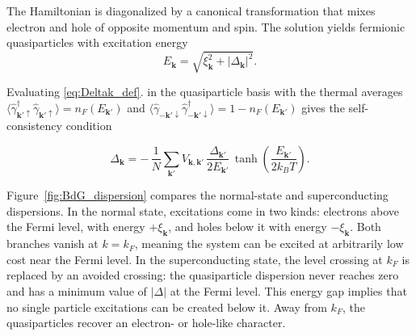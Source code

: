 \documentclass[11pt,a4paper,twoside,openany]{report}
\begin{document}
The Hamiltonian is diagonalized by a canonical transformation
that mixes electron and hole of opposite momentum and spin. The solution yields fermionic quasiparticles with excitation energy
\[
  E_{\mathbf{k}} = \sqrt{\xi_{\mathbf{k}}^{2}+|\Delta_{\mathbf{k}}|^{2}} .
\]


Evaluating \eqref{eq:Deltak_def}.  in the quasiparticle basis with the thermal averages
$\langle \hat{\gamma}_{\mathbf{k}'\uparrow}^{\dagger} \hat{\gamma}_{\mathbf{k}'\uparrow} \rangle
 = n_{F}(E_{\mathbf{k}'})$
and
$\langle \hat{\gamma}_{-\mathbf{k}'\downarrow} \hat{\gamma}_{-\mathbf{k}'\downarrow}^{\dagger} \rangle
 = 1-n_{F}(E_{\mathbf{k}'})$ gives the self-consistency condition
 
\begin{equation}\label{eq:gap_eq_momentum}
  \boxed{
  \Delta_{\mathbf{k}} = -\,\frac{1}{N} \sum_{\mathbf{k}'} V_{\mathbf{k},\mathbf{k}'}\,
  \frac{\Delta_{\mathbf{k}'}}{2E_{\mathbf{k}'}}\,
  \tanh\!\left( \frac{E_{\mathbf{k}'}}{2k_{B}T} \right) .} 
\end{equation}

Figure~\ref{fig:BdG_dispersion} compares the normal-state and superconducting dispersions. In the normal state, excitations come in two kinds: electrons above the Fermi level, with energy $+\xi_\mathbf{k}$, and holes below it with energy $-\xi_\mathbf{k}$. Both branches vanish at $k=k_F$, meaning the system can be excited at arbitrarily low cost near the Fermi level. In the superconducting state, the level crossing at $k_F$ is replaced by an avoided crossing: the quasiparticle dispersion never reaches zero and has a minimum value of $|\Delta|$ at the Fermi level. This energy gap implies that no single particle excitations can be created below it. Away from $k_F$, the quasiparticles recover an electron- or hole-like character.
\end{document}
